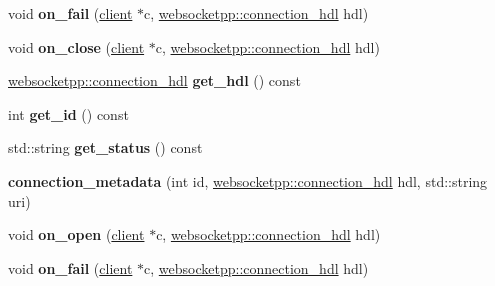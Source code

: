 \begin{DoxyCompactItemize}
void {\bfseries on\+\_\+fail} (\mbox{\hyperlink{classwebsocketpp_1_1client}{client}} $\ast$c, \mbox{\hyperlink{namespacewebsocketpp_a6b3d26a10ee7229b84b776786332631d}{websocketpp\+::connection\+\_\+hdl}} hdl)
\item 
\mbox{\label{classconnection__metadata_ac297cf7710d8d510ef383b7395222ce5}} 
void {\bfseries on\+\_\+close} (\mbox{\hyperlink{classwebsocketpp_1_1client}{client}} $\ast$c, \mbox{\hyperlink{namespacewebsocketpp_a6b3d26a10ee7229b84b776786332631d}{websocketpp\+::connection\+\_\+hdl}} hdl)
\item 
\mbox{\label{classconnection__metadata_a76a6a10e9192cd0ca03e2a2539cf4549}} 
\mbox{\hyperlink{namespacewebsocketpp_a6b3d26a10ee7229b84b776786332631d}{websocketpp\+::connection\+\_\+hdl}} {\bfseries get\+\_\+hdl} () const
\item 
\mbox{\label{classconnection__metadata_a3f71fbb092ec54e496464e42d960a22d}} 
int {\bfseries get\+\_\+id} () const
\item 
\mbox{\label{classconnection__metadata_aefe28a6b0b27076c685d66727e0f0a9d}} 
std\+::string {\bfseries get\+\_\+status} () const
\item 
\mbox{\label{classconnection__metadata_ab73db2e336676ec4efa4d4dc5051958f}} 
{\bfseries connection\+\_\+metadata} (int id, \mbox{\hyperlink{namespacewebsocketpp_a6b3d26a10ee7229b84b776786332631d}{websocketpp\+::connection\+\_\+hdl}} hdl, std\+::string uri)
\item 
\mbox{\label{classconnection__metadata_ab10d997bd75d9e98b235b7e97b84b85a}} 
void {\bfseries on\+\_\+open} (\mbox{\hyperlink{classwebsocketpp_1_1client}{client}} $\ast$c, \mbox{\hyperlink{namespacewebsocketpp_a6b3d26a10ee7229b84b776786332631d}{websocketpp\+::connection\+\_\+hdl}} hdl)
\item 
\mbox{\label{classconnection__metadata_a1c2e652001b8306207beafe17b1a52ed}} 
void {\bfseries on\+\_\+fail} (\mbox{\hyperlink{classwebsocketpp_1_1client}{client}} $\ast$c, \mbox{\hyperlink{namespacewebsocketpp_a6b3d26a10ee7229b84b776786332631d}{websocketpp\+::connection\+\_\+hdl}} hdl)

\end{DoxyCompactItemize}
